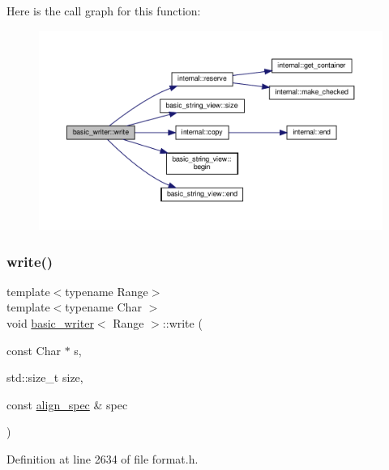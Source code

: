Here is the call graph for this function\+:
\nopagebreak
\begin{figure}[H]
\begin{center}
\leavevmode
\includegraphics[width=350pt]{classbasic__writer_ac6bb2fa0a1325a20d4288b66378fb4dd_cgraph}
\end{center}
\end{figure}
\mbox{\label{classbasic__writer_ab3396f1d61f77e4a3c2e12062f206a5c}} 
\subsubsection{\texorpdfstring{write()}{write()}\hspace{0.1cm}{\footnotesize\ttfamily [14/16]}}
{\footnotesize\ttfamily template$<$typename Range$>$ \\
template$<$typename Char $>$ \\
void \hyperlink{classbasic__writer}{basic\+\_\+writer}$<$ Range $>$\+::write (\begin{DoxyParamCaption}\item[{const Char $\ast$}]{s,  }\item[{std\+::size\+\_\+t}]{size,  }\item[{const \hyperlink{structalign__spec}{align\+\_\+spec} \&}]{spec }\end{DoxyParamCaption})\hspace{0.3cm}{\ttfamily [inline]}}



Definition at line 2634 of file format.\+h.

\mbox{\label{classbasic__writer_a616e9e28d4395a215f7844b983c6bee5}} 
